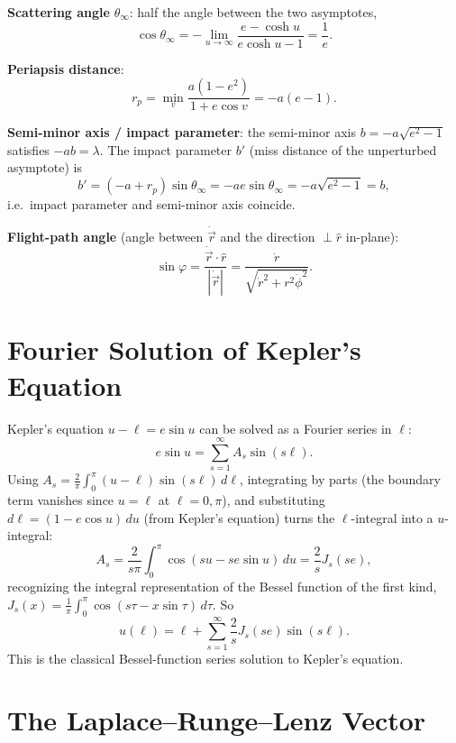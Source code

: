 \documentclass[11pt]{article}
\newcommand{\vecr}{\vec r}
\newcommand{\rhat}{\hat r}
\begin{document}
\textbf{Scattering angle} $\theta_\infty$: half the angle between the two asymptotes,
\begin{equation}
\cos\theta_\infty = -\lim_{u\to\infty}\frac{e-\cosh u}{e\cosh u -1} = \frac1e. \label{eq:scattering}
\end{equation}

\textbf{Periapsis distance}:
\begin{equation}
r_p = \min_v \frac{a(1-e^2)}{1+e\cos v} = -a(e-1). \label{eq:rp}
\end{equation}

\textbf{Semi-minor axis / impact parameter}: the semi-minor axis $b=-a\sqrt{e^2-1}$ satisfies $-ab=\lambda$. The impact parameter $b'$ (miss distance of the unperturbed asymptote) is
\[
b' = (-a+r_p)\sin\theta_\infty = -ae\sin\theta_\infty = -a\sqrt{e^2-1} = b,
\]
i.e.\ impact parameter and semi-minor axis coincide.

\textbf{Flight-path angle} (angle between $\dot{\vecr}$ and the direction $\perp\rhat$ in-plane):
\begin{equation}
\sin\varphi = \frac{\dot{\vecr}\cdot\rhat}{|\dot{\vecr}|}=\frac{\dot r}{\sqrt{\dot r^2+r^2\dot\phi^2}}. \label{eq:flightpath}
\end{equation}

\section{Fourier Solution of Kepler's Equation}
\label{sec:bessel}

Kepler's equation $u-\ell=e\sin u$ can be solved as a Fourier series in $\ell$:
\[
e\sin u = \sum_{s=1}^{\infty}A_s\sin(s\ell).
\]
Using $A_s = \tfrac2\pi\int_0^\pi (u-\ell)\sin(s\ell)\,d\ell$, integrating by parts (the boundary term vanishes since $u=\ell$ at $\ell=0,\pi$), and substituting $d\ell = (1-e\cos u)\,du$ (from Kepler's equation) turns the $\ell$-integral into a $u$-integral:
\[
A_s = \frac{2}{s\pi}\int_0^\pi \cos(su-se\sin u)\,du = \frac{2}{s}J_s(se),
\]
recognizing the integral representation of the Bessel function of the first kind, $J_s(x)=\tfrac1\pi\int_0^\pi\cos(s\tau-x\sin\tau)\,d\tau$. So
\begin{equation}
u(\ell) = \ell + \sum_{s=1}^{\infty}\frac{2}{s}J_s(se)\sin(s\ell). \label{eq:kepler_series}
\end{equation}
This is the classical Bessel-function series solution to Kepler's equation.

\section{The Laplace--Runge--Lenz Vector}
\end{document}
